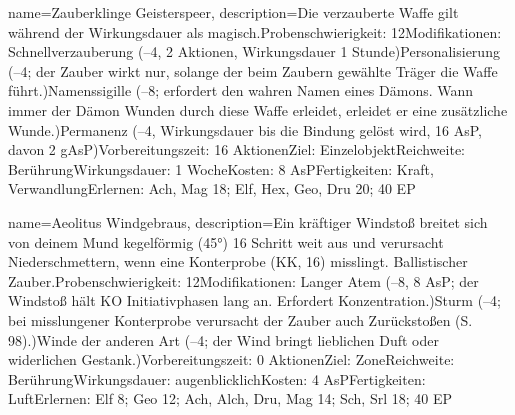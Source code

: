 {
    name={Zauberklinge Geisterspeer},
    description={Die verzauberte Waffe gilt während der Wirkungsdauer als magisch.\newline Probenschwierigkeit: 12\newline Modifikationen: Schnellverzauberung (–4, 2 Aktionen, Wirkungsdauer 1 Stunde)\newline Personalisierung (–4; der Zauber wirkt nur, solange der beim Zaubern gewählte Träger die Waffe führt.)\newline Namenssigille (–8; erfordert den wahren Namen eines Dämons. Wann immer der Dämon Wunden durch diese Waffe erleidet, erleidet er eine zusätzliche Wunde.)\newline Permanenz (–4, Wirkungsdauer bis die Bindung gelöst wird, 16 AsP, davon 2 gAsP)\newline Vorbereitungszeit: 16 Aktionen\newline Ziel: Einzelobjekt\newline Reichweite: Berührung\newline Wirkungsdauer: 1 Woche\newline Kosten: 8 AsP\newline Fertigkeiten: Kraft, Verwandlung\newline Erlernen: Ach, Mag 18; Elf, Hex, Geo, Dru 20; 40 EP}
}


{
    name={Aeolitus Windgebraus},
    description={Ein kräftiger Windstoß breitet sich von deinem Mund kegelförmig (45°) 16 Schritt weit aus und verursacht Niederschmettern, wenn eine Konterprobe (KK, 16) misslingt. Ballistischer Zauber.\newline Probenschwierigkeit: 12\newline Modifikationen: Langer Atem (–8, 8 AsP; der Windstoß hält KO Initiativphasen lang an. Erfordert Konzentration.)\newline Sturm (–4; bei misslungener Konterprobe verursacht der Zauber auch Zurückstoßen (S. 98).)\newline Winde der anderen Art (–4; der Wind bringt lieblichen Duft oder widerlichen Gestank.)\newline Vorbereitungszeit: 0 Aktionen\newline Ziel: Zone\newline Reichweite: Berührung\newline Wirkungsdauer: augenblicklich\newline Kosten: 4 AsP\newline Fertigkeiten: Luft\newline Erlernen: Elf 8; Geo 12; Ach, Alch, Dru, Mag 14; Sch, Srl 18; 40 EP}
}


